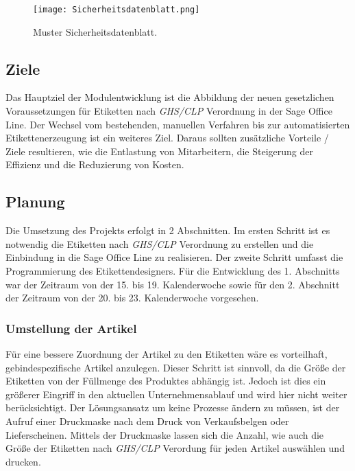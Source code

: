 \begin{figure}[H]
    \centering
    \texttt{[image: Sicherheitsdatenblatt.png]}
    \caption[Muster Sicherheitsdatenblatt]{\small{Muster Sicherheitsdatenblatt. \cite{fzp}}}
    \label{fig:sicherheitsdatenblatt}
\end{figure}

\subsection{Ziele}
Das Hauptziel der Modulentwicklung ist die Abbildung der neuen gesetzlichen Voraussetzungen für 
Etiketten nach \emph{GHS/CLP} Verordnung in der Sage Office Line. Der Wechsel vom bestehenden,
manuellen Verfahren bis zur automatisierten Etikettenerzeugung ist ein weiteres Ziel. Daraus 
sollten zusätzliche Vorteile / Ziele resultieren, wie die Entlastung von Mitarbeitern, 
die Steigerung der Effizienz und die Reduzierung von Kosten.

\subsection{Planung}

Die Umsetzung des Projekts erfolgt in 2 Abschnitten. Im ersten Schritt 
ist es notwendig die Etiketten nach \emph{GHS/CLP} Verordnung 
zu erstellen und die Einbindung in die Sage Office Line zu realisieren. 
Der zweite Schritt umfasst die Programmierung des Etikettendesigners. Für die Entwicklung
des 1. Abschnitts war der Zeitraum von der 15. bis 19. Kalenderwoche sowie für den 2. Abschnitt 
der Zeitraum von der 20. bis 23. Kalenderwoche vorgesehen.

\subsubsection{Umstellung der Artikel}

Für eine bessere Zuordnung der Artikel zu den Etiketten wäre es vorteilhaft, 
gebindespezifische Artikel anzulegen. Dieser Schritt ist sinnvoll, da die 
Größe der Etiketten von der Füllmenge des Produktes abhängig ist. Jedoch ist 
dies ein größerer Eingriff in den aktuellen Unternehmensablauf und wird hier
nicht weiter berücksichtigt. Der Lösungsansatz um keine Prozesse ändern zu
müssen, ist der Aufruf einer Druckmaske nach dem Druck von Verkaufsbelgen 
oder Lieferscheinen. Mittels der Druckmaske lassen sich die Anzahl, wie auch 
die Größe der Etiketten nach \emph{GHS/CLP} Verordung für jeden Artikel
auswählen und drucken.

